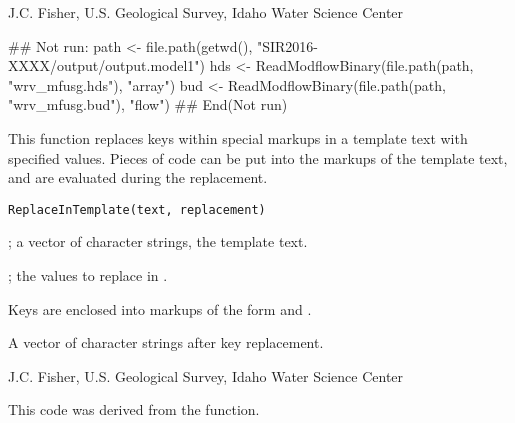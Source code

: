 \documentclass[letterpaper]{book}
\begin{document}
%
\begin{Author}\relax
J.C. Fisher, U.S. Geological Survey, Idaho Water Science Center
\end{Author}
%
\begin{SeeAlso}\relax
{}
\end{SeeAlso}
%
\begin{Examples}
\begin{ExampleCode}
## Not run: 
path <- file.path(getwd(), "SIR2016-XXXX/output/output.model1")
hds <- ReadModflowBinary(file.path(path, "wrv_mfusg.hds"), "array")
bud <- ReadModflowBinary(file.path(path, "wrv_mfusg.bud"), "flow")
## End(Not run)
\end{ExampleCode}
\end{Examples}
%
\begin{Description}\relax
This function replaces keys within special markups in a template text with specified values.
Pieces of \R{} code can be put into the markups of the template text, and are evaluated during the replacement.
\end{Description}
%
\begin{Usage}
\begin{verbatim}
ReplaceInTemplate(text, replacement)
\end{verbatim}
\end{Usage}
%
\begin{Arguments}
\begin{ldescription}
\item[\code{text}] ; a vector of character strings, the template text.
\item[\code{replacement}] ; the values to replace in .
\end{ldescription}
\end{Arguments}
%
\begin{Details}\relax
Keys are enclosed into markups of the form  and .
\end{Details}
%
\begin{Value}
A vector of character strings after key replacement.
\end{Value}
%
\begin{Author}\relax
J.C. Fisher, U.S. Geological Survey, Idaho Water Science Center
\end{Author}
%
\begin{References}\relax
This code was derived from the  function.
\end{References}
\end{document}
